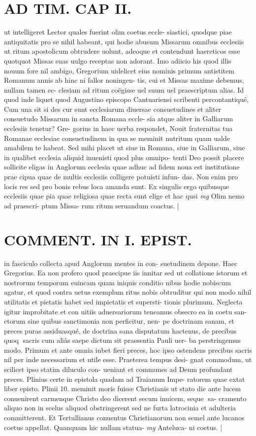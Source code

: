 \documentclass{article}
\begin{document}
\begin{pages}
\section*{AD TIM. CAP II. }
\marginpar{[ p.110 ]}\pstart ut intelligeret Lector quales fuerint olim coetus eccle- siastici, quodque piae antiquitatis pro se nihil habeant, qui hodie abusum Missarum omnibus ecclesiis ut ritum apostolicum obtrudere uolunt, adeoque et contendunt haereticos esse quotquot Missas suas uulgo receptas non adorant. Imo adiicio his quod illis nouum fore nil ambigo, Gregorium uidelicet eius nominis primum antistitem Romanum annis ab hinc ni fallor noningen- tis, cui et Missas maxime debemus, nullam tamen ec- clesiam ad ritum coëgisse uel suum uel praescriptum alias. Id quod inde liquet quod Augustino episcopo Cantuariensi scribenti percontantiqué, Cum una sit si des cur sunt ecclesiarum diuersae consuetudines et aliter consuetudo Missarum in sancta Romana eccle- sia atque aliter in Galliarum ecclesiis tenetur? Gre- gorius in haec uerba respondet, Nouit fraternitas tua Romanae ecclesiae consuetudinem in qua se meminit nutritum quam ualde amabilem te habeat. Sed mihi placet ut siue in Romana, siue in Galliarum, siue in qualibet ecclesia aliquid inuenisti quod plus omnipo- tenti Deo possit placere sollicite eligas in Anglorum ecclesia quae adhuc ad fidem noua est institutione prae cipua quae de multis ecclesiis colligere potuisti infun- das. Non enim pro locis res sed pro bonis rebus loca amanda sunt. Ex singulis ergo quibusque ecclesiis quae pia quae religiosa quae recta sunt elige et hac qusi  \pend
\textit{mg}
\footnotesize Olim nemo ad praescri- ptum Missa- rum ritum seruandum coactus. 
\normalsize| 
\section*{COMMENT. IN I. EPIST. }\pstart in fasciculo collecta apud Anglorum mentes in con- suetudinem depone. Haec Gregorius. Ea non profero quod praecipue iis innitar sed ut collatione istorum et nostrorum temporum euincam quam iniquis conditio nibus hodie nobiscum agatur, et quod contra uetus exemplum ritus nobis obtruditur qui non modo nihil utilitatis et pietatis habet sed impietatis et supersti- tionis plurimum. Neglecta igitur improbitate et con uitiis aduersariorum teneamus obsecro ea in coetu san- ctorum sine quibus sanctimonia non perficitur, nen- pe doctrinam sanam, et preces puras assiduasqué, de doctrina sana disputatum hactenus, de precibus quoq sacris cum aliâs saepe dictum sit praesentia Pauli uer- ba perstringemus modo. Primum et ante omnia iubet fieri preces, hoc ipso ostendens precibus sacris nil per inde necessarium et utile esse. Praeterea tempus desi- gnat commodum, ut scilicet ipso statim diluculo con- ueniant et communes ad Deum profundant preces. Plinius certe in epistola quadam ad Traianum Impe- ratorem quae extat liber  episto. Plinii 10. meminit moris fuisse Christianis ut stato die ante lucem conuenirent carmenque Christo deo dicerent secum inuicem, seque sa- cramento aliquo non in scelus aliquod obstringerent sed ne furta latrocinia et adulteria committerent. Et Tertullianus conuentus Christianorum non semel ante lucanos coetus appellat. Quanquam hic nullam statua-  \pend
\textit{mg}
\footnotesize Anteluca- ni coetus. 
\normalsize| 

\end{pages}
\end{document}

